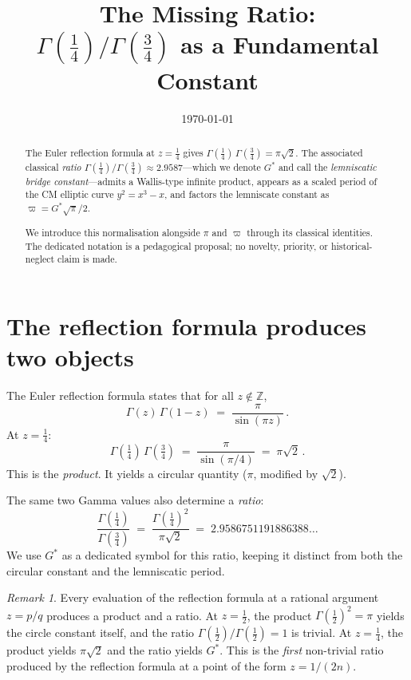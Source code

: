 \documentclass[12pt,reqno]{amsart}
\title[The Missing Ratio]{The Missing Ratio:\\[2pt]
  $\Gamma(\tfrac14)/\Gamma(\tfrac34)$ as a Fundamental Constant}
\author{}
\date{\today}
\theoremstyle{definition}
\theoremstyle{remark}
\newtheorem{remark}[theorem]{Remark}
\newcommand{\ZZ}{\mathbb{Z}}
\newcommand{\Gstar}{G^{\!*}}
\newcommand{\varpiup}{\varpi}
\begin{document}
\begin{abstract}
The Euler reflection formula at $z=\tfrac14$ gives
$\Gamma(\tfrac14)\,\Gamma(\tfrac34) = \pi\sqrt{2}$.
The associated classical \emph{ratio}
$\Gamma(\tfrac14)/\Gamma(\tfrac34) \approx 2.9587$---which
we denote $\Gstar$ and call the \emph{lemniscatic bridge constant}---admits
a Wallis-type infinite product, appears as a scaled period of the CM elliptic curve
$y^{2}=x^{3}-x$, and factors the lemniscate constant as
$\varpiup = {\Gstar}\sqrt{\pi}/2$.

We introduce this normalisation alongside $\pi$ and $\varpiup$ through
its classical identities. The dedicated notation is a pedagogical
proposal; no novelty, priority, or historical-neglect claim is made.
\end{abstract}

\maketitle
\tableofcontents


\section{The reflection formula produces two objects}

The Euler reflection formula states that for all $z\notin\ZZ$,
\begin{equation}\label{eq:reflection}
  \Gamma(z)\,\Gamma(1-z) \;=\; \frac{\pi}{\sin(\pi z)}\,.
\end{equation}
At $z = \tfrac14$:
\begin{equation}\label{eq:product}
  \Gamma(\tfrac14)\,\Gamma(\tfrac34)
  \;=\; \frac{\pi}{\sin(\pi/4)}
  \;=\; \pi\sqrt{2}\,.
\end{equation}
This is the \emph{product}. It yields a circular quantity ($\pi$,
modified by $\sqrt{2}$).

The same two Gamma values also determine a \emph{ratio}:
\begin{equation}\label{eq:ratio}
  \frac{\Gamma(\tfrac14)}{\Gamma(\tfrac34)}
  \;=\; \frac{\Gamma(\tfrac14)^{2}}{\pi\sqrt{2}}
  \;=\; 2.9586751191886388\ldots
\end{equation}
We use $\Gstar$ as a dedicated symbol for this ratio, keeping it
distinct from both the circular constant and the lemniscatic period.

\begin{remark}
Every evaluation of the reflection formula at a rational argument
$z = p/q$ produces a product and a ratio.  At $z = \tfrac12$, the
product $\Gamma(\tfrac12)^{2} = \pi$ yields the circle constant itself,
and the ratio $\Gamma(\tfrac12)/\Gamma(\tfrac12) = 1$ is trivial.
At $z = \tfrac14$, the product yields $\pi\sqrt{2}$ and the ratio
yields $\Gstar$.  This is the \emph{first} non-trivial ratio produced
by the reflection formula at a point of the form $z = 1/(2n)$.
\end{remark}
\end{document}
